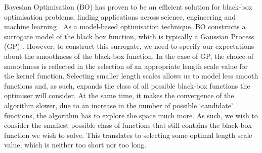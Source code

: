 \documentclass{article}
\theoremstyle{plain}
\theoremstyle{definition}
\theoremstyle{remark}
\theoremstyle{plain}
\begin{document}
Bayesian Optimisation (BO) \cite{garnett2023bayesian} has proven to be an efficient solution for black-box optimisation problems, finding applications across science, engineering and machine learning \cite{ cowen2022hebo, grosnit2022boils, khan2023toward}. As a model-based optimisation technique, BO constructs a surrogate model of the black box function, which is typically a Gaussian Process (GP) \cite{williams2006gaussian}. However, to construct this surrogate, we need to specify our expectations about the smoothness of the black-box function. In the case of GP, the choice of smoothness is reflected in the selection of an appropriate length scale value for the kernel function. Selecting smaller length scales allows us to model less smooth functions and, as such, expands the class of all possible black-box functions the optimiser will consider. At the same time, it makes the convergence of the algorithm slower, due to an increase in the number of possible `candidate' functions, the algorithm has to explore the space much more. As such, we wish to consider the smallest possible class of functions that still contains the black-box function we wish to solve. This translates to selecting some optimal length scale value, which is neither too short nor too long. 
\end{document}
